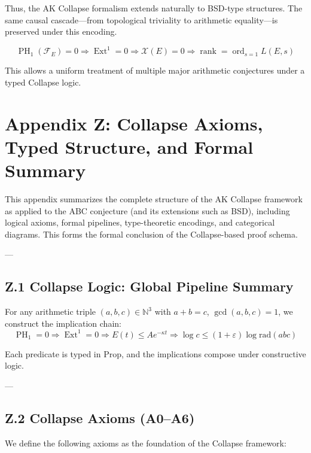 \documentclass[11pt]{article}
\DeclareMathOperator{\Ext}{Ext}
\DeclareMathOperator{\PH}{PH}
\newcommand{\Sha}{\mathcal{X}}
\begin{document}
Thus, the AK Collapse formalism extends naturally to BSD-type structures.  
The same causal cascade—from topological triviality to arithmetic equality—is preserved under this encoding.

\[
\boxed{
\PH_1(\mathcal{F}_E) = 0 \Rightarrow \Ext^1 = 0 \Rightarrow \Sha(E) = 0 \Rightarrow \operatorname{rank} = \operatorname{ord}_{s=1} L(E,s)
}
\]

This allows a uniform treatment of multiple major arithmetic conjectures under a typed Collapse logic.



\section*{Appendix Z: Collapse Axioms, Typed Structure, and Formal Summary}

This appendix summarizes the complete structure of the AK Collapse framework as applied to the ABC conjecture  
(and its extensions such as BSD), including logical axioms, formal pipelines, type-theoretic encodings, and categorical diagrams.  
This forms the formal conclusion of the Collapse-based proof schema.

---

\subsection*{Z.1 Collapse Logic: Global Pipeline Summary}

For any arithmetic triple \( (a,b,c) \in \mathbb{N}^3 \) with \( a + b = c \), \( \gcd(a,b,c) = 1 \), we construct the implication chain:
\[
\boxed{
\PH_1 = 0 \Rightarrow \Ext^1 = 0 \Rightarrow E(t) \leq Ae^{-\kappa t} \Rightarrow \log c \leq (1+\varepsilon)\log \mathrm{rad}(abc)
}
\]

Each predicate is typed in \( \mathrm{Prop} \), and the implications compose under constructive logic.

---

\subsection*{Z.2 Collapse Axioms (A0–A6)}

We define the following axioms as the foundation of the Collapse framework:
\end{document}
